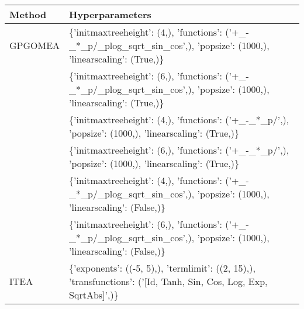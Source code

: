 \begin{tabular}{l p{37em}}
\toprule
       Method &                                                                                                                                                                                                                                                                                Hyperparameters \\
\midrule
\midrule
      GPGOMEA &                                                                                                                                                                        \{'initmaxtreeheight': (4,), 'functions': ('+\_-\_*\_p/\_plog\_sqrt\_sin\_cos',), 'popsize': (1000,), 'linearscaling': (True,)\} \\
              &                                                                                                                                                                        \{'initmaxtreeheight': (6,), 'functions': ('+\_-\_*\_p/\_plog\_sqrt\_sin\_cos',), 'popsize': (1000,), 'linearscaling': (True,)\} \\
              &                                                                                                                                                                                          \{'initmaxtreeheight': (4,), 'functions': ('+\_-\_*\_p/',), 'popsize': (1000,), 'linearscaling': (True,)\} \\
              &                                                                                                                                                                                          \{'initmaxtreeheight': (6,), 'functions': ('+\_-\_*\_p/',), 'popsize': (1000,), 'linearscaling': (True,)\} \\
              &                                                                                                                                                                       \{'initmaxtreeheight': (4,), 'functions': ('+\_-\_*\_p/\_plog\_sqrt\_sin\_cos',), 'popsize': (1000,), 'linearscaling': (False,)\} \\
              &                                                                                                                                                                       \{'initmaxtreeheight': (6,), 'functions': ('+\_-\_*\_p/\_plog\_sqrt\_sin\_cos',), 'popsize': (1000,), 'linearscaling': (False,)\} \\
\midrule
         ITEA &                                                                                                                                                                             \{'exponents': ((-5, 5),), 'termlimit': ((2, 15),), 'transfunctions': ('[Id, Tanh, Sin, Cos, Log, Exp, SqrtAbs]',)\} \\

\end{tabular}
